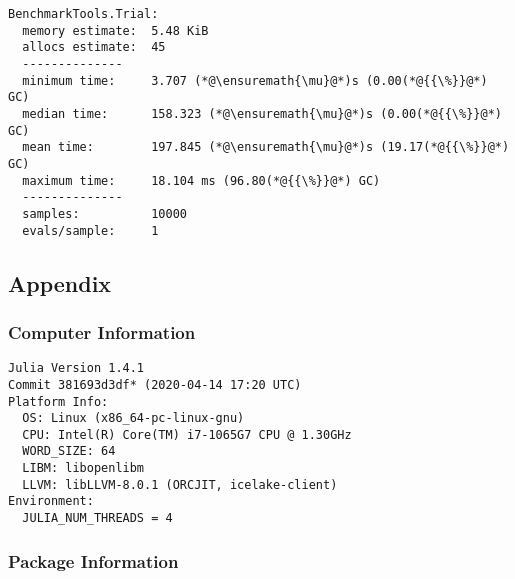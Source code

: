 \documentclass[12pt,a4paper]{article}
\begin{document}
\begin{lstlisting}
BenchmarkTools.Trial: 
  memory estimate:  5.48 KiB
  allocs estimate:  45
  --------------
  minimum time:     3.707 (*@\ensuremath{\mu}@*)s (0.00(*@{{\%}}@*) GC)
  median time:      158.323 (*@\ensuremath{\mu}@*)s (0.00(*@{{\%}}@*) GC)
  mean time:        197.845 (*@\ensuremath{\mu}@*)s (19.17(*@{{\%}}@*) GC)
  maximum time:     18.104 ms (96.80(*@{{\%}}@*) GC)
  --------------
  samples:          10000
  evals/sample:     1
\end{lstlisting}



\subsection{Appendix}

\subsubsection{Computer Information}

\begin{verbatim}
Julia Version 1.4.1
Commit 381693d3df* (2020-04-14 17:20 UTC)
Platform Info:
  OS: Linux (x86_64-pc-linux-gnu)
  CPU: Intel(R) Core(TM) i7-1065G7 CPU @ 1.30GHz
  WORD_SIZE: 64
  LIBM: libopenlibm
  LLVM: libLLVM-8.0.1 (ORCJIT, icelake-client)
Environment:
  JULIA_NUM_THREADS = 4

\end{verbatim}

\subsubsection{Package Information}
\end{document}
